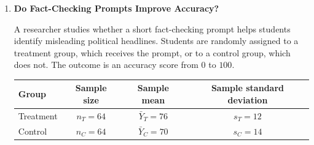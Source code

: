 \documentclass[12pt]{article}
\begin{document}
\begin{enumerate}
\begin{enumerate}[label=(\alph*)]
        \item Since the question is whether support is above a majority threshold,
        \[
            H_0: p = 0.50, \qquad H_A: p > 0.50.
        \]

        \item Under the null,
        \[
            \mathrm{SE}_0(\hat{p}) = \sqrt{\frac{0.50(1-0.50)}{400}} = \sqrt{\frac{0.25}{400}} = 0.025.
        \]

        \item The test statistic is
        \[
            z = \frac{0.54 - 0.50}{0.025} = 1.6.
        \]

        \item The p-value is approximately \(P(Z \geq 1.6) = 0.055\). If true support were exactly \(50\%\), a survey estimate at least as high as \(54\%\) would occur about \(5.5\%\) of the time by sampling variation. This is suggestive evidence of majority support, but it is just above the conventional \(5\%\) threshold.

        \item The confidence interval uses
        \[
            \sqrt{\frac{0.54(1-0.54)}{400}} \approx 0.0249.
        \]
        Therefore,
        \[
            0.54 \pm 1.96(0.0249) \approx 0.54 \pm 0.0488 = [0.4912,\ 0.5888].
        \]
        The interval includes \(0.50\). This is consistent with the p-value: the survey points toward majority support, but the evidence is not quite strong enough to confidently rule out \(50\%\) at the \(5\%\) level.
    \end{enumerate}
    \fi \color{black}

    \item \textbf{Do Fact-Checking Prompts Improve Accuracy?}

    A researcher studies whether a short fact-checking prompt helps students identify misleading political headlines. Students are randomly assigned to a treatment group, which receives the prompt, or to a control group, which does not. The outcome is an accuracy score from \(0\) to \(100\).

    \begin{table}[H]
        \centering
        \begin{tabular}{lccc}
            \toprule
            \textbf{Group} & \textbf{Sample size} & \textbf{Sample mean} & \textbf{Sample standard deviation} \\
            \midrule
            Treatment & \(n_T = 64\) & \(\bar{Y}_T = 76\) & \(s_T = 12\) \\
            Control & \(n_C = 64\) & \(\bar{Y}_C = 70\) & \(s_C = 14\) \\
            \bottomrule
        \end{tabular}
    \end{table}


\end{enumerate}
\end{document}
